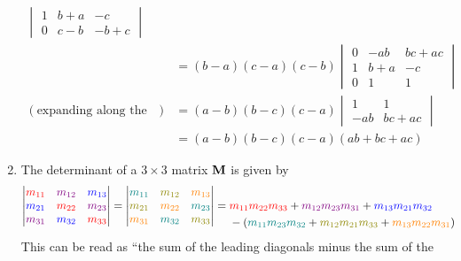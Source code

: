 \documentclass[fleqn,a4paper,11pt]{article}
\begin{document}
\begin{enumerate}[label=\textbf{\arabic*.}]
\begin{alignat*}
\begin{vmatrix}
      1 & b + a & -c \\
      0 & c - b & -b + c
     \end{vmatrix} \\
    && &= (b - a)(c - a)(c - b)\begin{vmatrix}
      0 & -ab & bc + ac \\
      1 & b + a & -c \\
      0 & 1 & 1
     \end{vmatrix} \\
    (\text{expanding along the first column})
    && &= (a - b)(b - c)(c - a)\begin{vmatrix}
      1 & 1 \\
      -ab & bc + ac
     \end{vmatrix} \\
    && &= (a - b)(b - c)(c - a)(ab + bc + ac)
   \end{alignat*}
  \item
   \begin{lemma}
    \label{lemma_sarrus}
    The determinant of a \(3 \times 3\) matrix \(\mathbf{M}\) is given by
    \begin{align*}
     \begin{vmatrix}
      \color{red}m_{11} & \color{violet}m_{12} & \color{blue}m_{13} \\
      \color{blue}m_{21} & \color{red}m_{22} & \color{violet}m_{23} \\
      \color{violet}m_{31} & \color{blue}m_{32} & \color{red}m_{33}
     \end{vmatrix} =
     \begin{vmatrix}
      \color{teal}m_{11} & \color{olive}m_{12} & \color{orange}m_{13} \\
      \color{olive}m_{21} & \color{orange}m_{22} & \color{teal}m_{23} \\
      \color{orange}m_{31} & \color{teal}m_{32} & \color{olive}m_{33}
     \end{vmatrix} &=
     \begin{aligned}[t]
      &  \textcolor{red}{m_{11} m_{22} m_{33}}
       + \textcolor{violet}{m_{12} m_{23} m_{31}}
       + \textcolor{blue}{m_{13} m_{21} m_{32}} \\
      &-(\textcolor{teal}{m_{11} m_{23} m_{32}}
       + \textcolor{olive}{m_{12} m_{21} m_{33}}
       + \textcolor{orange}{m_{13} m_{22} m_{31}})
     \end{aligned}
    \end{align*}
    This can be read as ``the sum of the leading diagonals minus the sum of the

\end{lemma}
\end{enumerate}
\end{document}
